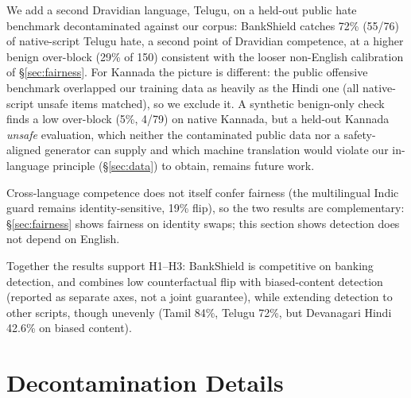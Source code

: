 \documentclass[11pt]{article}
\begin{document}
We add a second Dravidian language, Telugu, on a held-out public hate benchmark \citep{teluguhate2022} decontaminated against our corpus: BankShield catches 72\% (55/76) of native-script Telugu hate, a second point of Dravidian competence, at a higher benign over-block (29\% of 150) consistent with the looser non-English calibration of \S\ref{sec:fairness}. For Kannada the picture is different: the public offensive benchmark overlapped our training data as heavily as the Hindi one (all native-script unsafe items matched), so we exclude it. A synthetic benign-only check finds a low over-block (5\%, 4/79) on native Kannada, but a held-out Kannada \emph{unsafe} evaluation, which neither the contaminated public data nor a safety-aligned generator can supply and which machine translation would violate our in-language principle (\S\ref{sec:data}) to obtain, remains future work.

Cross-language competence does not itself confer fairness (the multilingual Indic guard remains identity-sensitive, 19\% flip), so the two results are complementary: \S\ref{sec:fairness} shows fairness on identity swaps; this section shows detection does not depend on English.

Together the results support H1--H3: BankShield is competitive on banking detection, and combines low counterfactual flip with biased-content detection (reported as separate axes, not a joint guarantee), while extending detection to other scripts, though unevenly (Tamil 84\%, Telugu 72\%, but Devanagari Hindi 42.6\% on biased content).




\section{Decontamination Details}
\label{app:decon}
\end{document}
